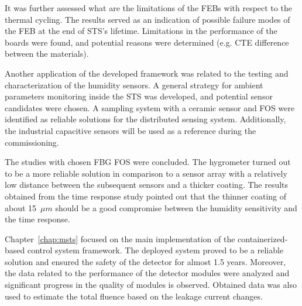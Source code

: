 It was further assessed what are the limitations of the \glspl{FEB} with respect to the thermal cycling. The results served as an indication of possible failure modes of the \gls{FEB} at the end of \gls{STS}'s lifetime. Limitations in the performance of the boards were found, and potential reasons were determined (e.g. \gls{CTE} difference between the materials). 

Another application of the developed framework was related to the testing and characterization of the humidity sensors. A general strategy for ambient parameters monitoring inside the \gls{STS} was developed, and potential sensor candidates were chosen. A sampling system with a ceramic sensor and \gls{FOS} were identified as reliable solutions for the distributed sensing system. Additionally, the industrial capacitive sensors will be used as a reference during the commissioning.

The studies with chosen \gls{FBG} \gls{FOS} were concluded. The hygrometer turned out to be a more reliable solution in comparison to a sensor array with a relatively low distance between the subsequent sensors and a thicker coating. The results obtained from the time response study pointed out that the thinner coating of about 15~$\mu m$ should be a good compromise between the humidity sensitivity and the time response. 

Chapter~\ref{chap:msts} focused on the main implementation of the containerized-based control system framework. The deployed system proved to be a reliable solution and ensured the safety of the detector for almost 1.5 years. Moreover, the data related to the performance of the detector modules were analyzed and significant progress in the quality of modules is observed. Obtained data was also used to estimate the total fluence based on the leakage current changes. 


